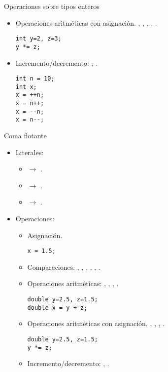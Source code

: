 \begin{frame}[fragile,t]{Operaciones sobre tipos enteros}
\begin{itemize}
  \item Operaciones aritméticas con asignación.
    \cppkey{+=}, \cppkey{-=}, \cppkey{*=}, \cppkey{/=}, \cppkey{\%=}.
\begin{lstlisting}
int y=2, z=3;
y *= z;
\end{lstlisting}
  \item Incremento/decremento: \cppkey{++}, \cppkey{-{}-}.
\begin{lstlisting}
int n = 10;
int x;
x = ++n;
x = n++;
x = --n;
x = n--;
\end{lstlisting}
\end{itemize}
\end{frame}


\begin{frame}[fragile]{Coma flotante}
\begin{itemize}
  \item Literales:
    \begin{itemize}
      \item {} $\rightarrow$ .
      \item {} $\rightarrow$ .
      \item {} $\rightarrow$ .
    \end{itemize}
  \item Operaciones:
    \begin{itemize}
      \item Asignación.
\begin{lstlisting}
x = 1.5;
\end{lstlisting}
      \item Comparaciones:
        \cppkey{==},
        \cppkey{!=},
        \cppkey{<},
        \cppkey{<=},
        \cppkey{>},
        \cppkey{>=}.
      \item Operaciones aritméticas: 
        \cppkey{+}, \cppkey{-}, \cppkey{*}, \cppkey{/}.
\begin{lstlisting}
double y=2.5, z=1.5;
double x = y + z;
\end{lstlisting}
      \item Operaciones aritméticas con asignación.
        \cppkey{+=}, \cppkey{-=}, \cppkey{*=}, \cppkey{/=}.
\begin{lstlisting}
double y=2.5, z=1.5;
y *= z;
\end{lstlisting}
      \item Incremento/decremento: \cppkey{++}, \cppkey{-{}-}.
    \end{itemize}
\end{itemize}
\end{frame}

